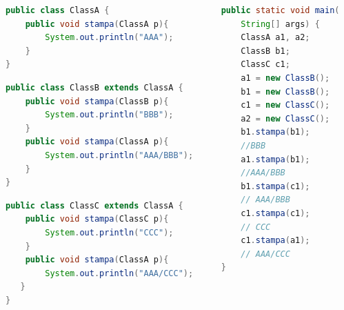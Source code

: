 \documentclass{beamer}
\begin{document}
\begin{frame}[fragile]
\begin{columns}
\begin{column}{0.6\textwidth}
\begin{lstlisting}[language=Java,escapechar=|]
public class ClassA {
    public void stampa(ClassA p){
        System.out.println("AAA");
    }
}
\end{lstlisting}
\begin{lstlisting}[language=Java,escapechar=|]
public class ClassB extends ClassA {
    public void stampa(ClassB p){
        System.out.println("BBB");
    }
    public void stampa(ClassA p){
        System.out.println("AAA/BBB");
    }
}
\end{lstlisting}
\begin{lstlisting}[language=Java,escapechar=|]
public class ClassC extends ClassA {
    public void stampa(ClassC p){
        System.out.println("CCC");
    }
    public void stampa(ClassA p){
        System.out.println("AAA/CCC");
   }
}
\end{lstlisting}
\end{column}
\begin{column}{0.4\textwidth}
\begin{lstlisting}[language=Java,escapechar=|]
public static void main(
    String[] args) {
    ClassA a1, a2;
    ClassB b1;
    ClassC c1;
    a1 = new ClassB();
    b1 = new ClassB();
    c1 = new ClassC();
    a2 = new ClassC();
    b1.stampa(b1); 
    //BBB
    a1.stampa(b1);  
    //AAA/BBB
    b1.stampa(c1); 
    // AAA/BBB
    c1.stampa(c1); 
    // CCC
    c1.stampa(a1); 
    // AAA/CCC
}
\end{lstlisting}
\end{column}
\end{columns}
\end{frame}
\end{document}

